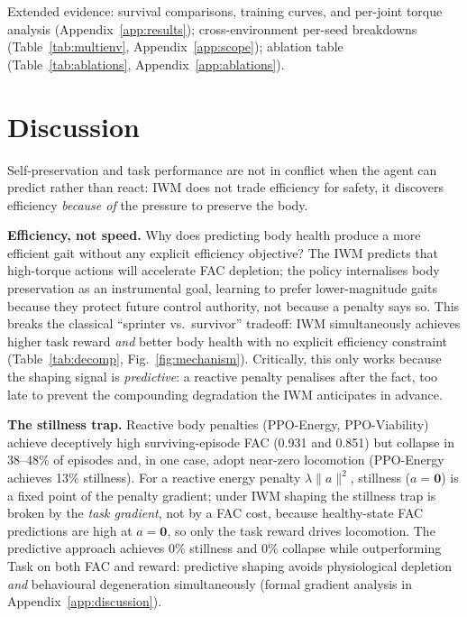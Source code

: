 \documentclass{article}
\begin{document}
{Extended evidence: survival comparisons, training curves, and per-joint torque analysis (Appendix~\ref{app:results}); cross-environment per-seed breakdowns (Table~\ref{tab:multienv}, Appendix~\ref{app:scope}); ablation table (Table~\ref{tab:ablations}, Appendix~\ref{app:ablations}).

\section{Discussion}
\label{sec:discussion}

Self-preservation and task performance are not in conflict when the agent can predict rather than react: IWM does not trade efficiency for safety, it discovers efficiency \emph{because of} the pressure to preserve the body.

\textbf{Efficiency, not speed.}
Why does predicting body health produce a more efficient gait without any explicit efficiency objective?
The IWM predicts that high-torque actions will accelerate FAC depletion; the policy internalises body preservation as an instrumental goal, learning to prefer lower-magnitude gaits because they protect future control authority, not because a penalty says so.
This breaks the classical ``sprinter vs.\ survivor'' tradeoff: IWM simultaneously achieves higher task reward \emph{and} better body health with no explicit efficiency constraint (Table~\ref{tab:decomp}, Fig.~\ref{fig:mechanism}).
Critically, this only works because the shaping signal is \emph{predictive}: a reactive penalty penalises after the fact, too late to prevent the compounding degradation the IWM anticipates in advance.

\textbf{The stillness trap.}
Reactive body penalties (PPO-Energy, PPO-Viability) achieve deceptively high surviving-episode FAC (0.931 and 0.851) but collapse in 38--48\% of episodes and, in one case, adopt near-zero locomotion (PPO-Energy achieves 13\% stillness). For a reactive energy penalty $\lambda\|a\|^2$, stillness ($a\!=\!\mathbf{0}$) is a fixed point of the penalty gradient; under IWM shaping the stillness trap is broken by the \emph{task gradient}, not by a FAC cost, because healthy-state FAC predictions are high at $a\!=\!\mathbf{0}$, so only the task reward drives locomotion. The predictive approach achieves 0\% stillness and 0\% collapse while outperforming Task on both FAC and reward: predictive shaping avoids physiological depletion \emph{and} behavioural degeneration simultaneously (formal gradient analysis in Appendix~\ref{app:discussion}).


}
\end{document}
